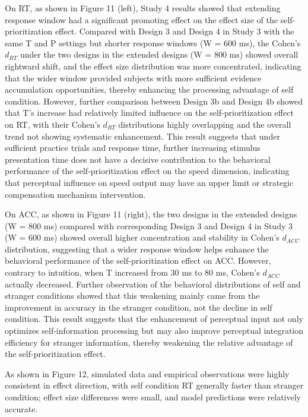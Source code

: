 \documentclass[
  english,
  man,floatsintext]{apa6}
\begin{document}
On RT, as shown in Figure 11 (left), Study 4 results showed that extending response window had a significant promoting effect on the effect size of the self-prioritization effect. Compared with Design 3 and Design 4 in Study 3 with the same T and P settings but shorter response windows (W = 600 ms), the Cohen's \(d_{RT}\) under the two designs in the extended designs (W = 800 ms) showed overall rightward shift, and the effect size distribution was more concentrated, indicating that the wider window provided subjects with more sufficient evidence accumulation opportunities, thereby enhancing the processing advantage of self condition. However, further comparison between Design 3b and Design 4b showed that T's increase had relatively limited influence on the self-prioritization effect on RT, with their Cohen's \(d_{RT}\) distributions highly overlapping and the overall trend not showing systematic enhancement. This result suggests that under sufficient practice trials and response time, further increasing stimulus presentation time does not have a decisive contribution to the behavioral performance of the self-prioritization effect on the speed dimension, indicating that perceptual influence on speed output may have an upper limit or strategic compensation mechanism intervention.

On ACC, as shown in Figure 11 (right), the two designs in the extended designs (W = 800 ms) compared with corresponding Design 3 and Design 4 in Study 3 (W = 600 ms) showed overall higher concentration and stability in Cohen's \(d_{ACC}\) distribution, suggesting that a wider response window helps enhance the behavioral performance of the self-prioritization effect on ACC. However, contrary to intuition, when T increased from 30 ms to 80 ms, Cohen's \(d_{ACC}\) actually decreased. Further observation of the behavioral distributions of self and stranger conditions showed that this weakening mainly came from the improvement in accuracy in the stranger condition, not the decline in self condition. This result suggests that the enhancement of perceptual input not only optimizes self-information processing but may also improve perceptual integration efficiency for stranger information, thereby weakening the relative advantage of the self-prioritization effect.

As shown in Figure 12, simulated data and empirical observations were highly consistent in effect direction, with self condition RT generally faster than stranger condition; effect size differences were small, and model predictions were relatively accurate.
\end{document}
